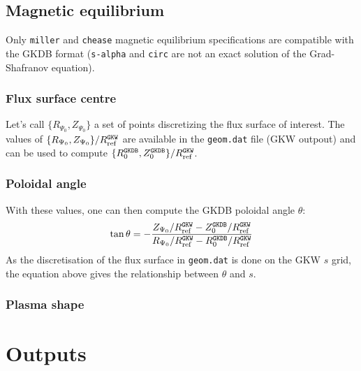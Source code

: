 \documentclass[a4paper]{report}
\begin{document}
\section{Magnetic equilibrium} \label{sec:magequil}
Only \texttt{miller} and \texttt{chease} magnetic equilibrium specifications are compatible with the GKDB format (\texttt{s-alpha} and \texttt{circ} are not an exact solution of the Grad-Shafranov equation).
\subsection{Flux surface centre}
Let's call $\{R_{\Psi_0},Z_{\Psi_0}\}$ a set of points discretizing the flux surface of interest. The values of $\{R_{\Psi_0},Z_{\Psi_0}\}/R_{\textrm{ref}}^{\texttt{GKW}}$ are available in the \texttt{geom.dat} file (GKW outpout) and can be used to compute $\{R_0^{\texttt{GKDB}},Z_0^{\texttt{GKDB}}\}/R_{\textrm{ref}}^{\texttt{GKW}}$. 

\subsection{Poloidal angle}
With these values, one can then compute the GKDB poloidal angle $\theta$:
\begin{equation}
 \tan \theta = - \frac{Z_{\Psi_0}/R_{\textrm{ref}}^{\texttt{GKW}}-Z_0^{\texttt{GKDB}}/R_{\textrm{ref}}^{\texttt{GKW}}}{R_{\Psi_0}/R_{\textrm{ref}}^{\texttt{GKW}}-R_0^{\texttt{GKDB}}/R_{\textrm{ref}}^{\texttt{GKW}}}
\end{equation}
As the discretisation of the flux surface in \texttt{geom.dat} is done on the GKW $s$ grid, the equation above gives the relationship between $\theta$ and $s$.


\subsection{Plasma shape}



\chapter{Outputs}



\end{document}
